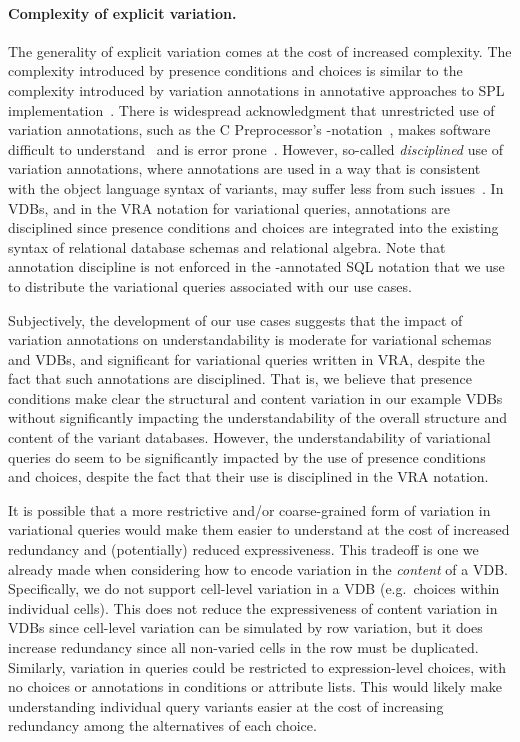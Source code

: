 \paragraph{Complexity of explicit variation.}
%
The generality of explicit variation comes at the cost of increased complexity.
The complexity introduced by presence conditions and choices is similar to the
complexity introduced by variation annotations in annotative approaches to SPL
implementation~\cite{KAK08}. There is widespread acknowledgment that
unrestricted use of variation annotations, such as the C Preprocessor's -notation~\cite{cpp}, makes software difficult to understand~\cite{LWE11vl} and
is error prone~\cite{FMKPA:SPLC16}.
%
However, so-called \emph{disciplined} use of variation annotations, where
annotations are used in a way that is consistent with the object language
syntax of variants, may suffer less from such issues~\cite{LKA:AOSD11}. In
VDBs, and in the VRA notation for variational queries, annotations are disciplined since
presence conditions and choices are integrated into the existing syntax of
relational database schemas and relational algebra.
%
Note that annotation discipline is not enforced in the -annotated SQL
notation that we use to distribute the variational queries associated with our use cases.


Subjectively, the development of our use cases suggests that the impact
of variation annotations on understandability is moderate for variational schemas and
VDBs, and significant for variational queries written in VRA, despite the fact that such
annotations are disciplined.
%
%
 That is, we believe that presence conditions make clear the structural and
 content variation in our example VDBs without significantly impacting the
 understandability of the overall structure and content of the variant
 databases. However, the understandability of variational queries do seem to be
 significantly impacted by the use of presence conditions and choices, despite
 the fact that their use is disciplined in the VRA notation.


It is possible that a more restrictive and/or coarse-grained form of variation
in variational queries would make them easier to understand at the cost of increased
redundancy and (potentially) reduced expressiveness.
%
This tradeoff is one we already made when considering how to encode variation
in the \emph{content} of a VDB. Specifically, we do not support cell-level
variation in a VDB (e.g.\ choices within individual cells). This does not
reduce the expressiveness of content variation in VDBs since cell-level
variation can be simulated by row variation, but it does increase redundancy
since all non-varied cells in the row must be duplicated.
%
Similarly, variation in queries could be restricted to expression-level
choices, with no choices or annotations in conditions or attribute lists. This
would likely make understanding individual query variants easier at the cost of
increasing redundancy among the alternatives of each choice.


